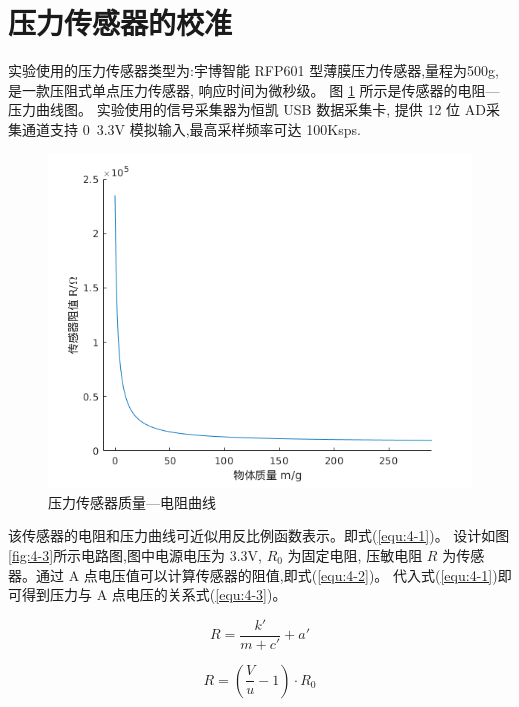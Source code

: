 \section{压力传感器的校准}
实验使用的压力传感器类型为:宇博智能 RFP601 型薄膜压力传感器,量程为500g,
是一款压阻式单点压力传感器, 响应时间为微秒级。
图 \ref{fig:4-2} 所示是传感器的电阻—压力曲线图。
实验使用的信号采集器为恒凯 USB 数据采集卡,
提供 12 位 AD采集通道支持 0~3.3V 模拟输入,最高采样频率可达 100Ksps.

\begin{figure}[!ht]
  \centering
  \includegraphics[scale=0.7]{chapter04/pic/4-2}
  \caption{压力传感器质量---电阻曲线}
  \label{fig:4-2}
  \vspace{-0.3cm}
\end{figure}

该传感器的电阻和压力曲线可近似用反比例函数表示。即式(\ref{equ:4-1})。
设计如图\ref{fig:4-3}所示电路图,图中电源电压为 3.3V, $R_0$ 为固定电阻,
压敏电阻 $R$ 为传感器。通过 A 点电压值可以计算传感器的阻值,即式(\ref{equ:4-2})。
代入式(\ref{equ:4-1})即可得到压力与 A 点电压的关系式(\ref{equ:4-3})。

\vspace{-10pt}
\begin{equation}
  \label{equ:4-1}
  R = \frac{{k'}}{{m + c'}} + a'
\end{equation}
\vspace{-30pt}

\begin{equation}
  \label{equ:4-2}
  R = (\frac{V}{u} - 1) \cdot {R_0}
\end{equation}
\vspace{-30pt}

